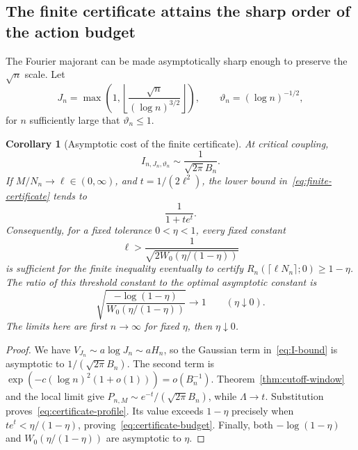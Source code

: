 \documentclass[11pt,a4paper]{article}
\numberwithin{equation}{section}
\newtheorem{corollary}[theorem]{Corollary}
\theoremstyle{definition}
\theoremstyle{remark}
\begin{document}
\subsection{The finite certificate attains the sharp order of the action budget}
The Fourier majorant can be made asymptotically sharp enough to preserve the
\(\sqrt n\) scale. Let
\begin{equation}
 J_n=\max\left(1,\left\lfloor\frac{\sqrt n}{(\log n)^{3/2}}\right\rfloor\right),
 \qquad \vartheta_n=(\log n)^{-1/2},
 \label{eq:J-choice}
\end{equation}
for \(n\) sufficiently large that \(\vartheta_n\le1\).

\begin{corollary}[Asymptotic cost of the finite certificate]
\label{cor:certificate-budget}
At critical coupling,
\[
 I_{n,J_n,\vartheta_n}\sim\frac{1}{\sqrt{2\pi}B_n}.
\]
If \(M/N_n\to\ell\in(0,\infty)\), and \(t=1/(2\ell^2)\), the lower
bound in~\eqref{eq:finite-certificate} tends to
\begin{equation}
 \frac{1}{1+t e^t}.
 \label{eq:certificate-profile}
\end{equation}
Consequently, for a fixed tolerance \(0<\eta<1\), every fixed constant
\begin{equation}
 \ell>\frac{1}{\sqrt{2W_0(\eta/(1-\eta))}}
 \label{eq:certificate-budget}
\end{equation}
is sufficient for the finite inequality eventually to certify
\(R_n(\lceil\ell N_n\rceil;0)\ge1-\eta\).
The ratio of this threshold constant to the optimal asymptotic constant is
\begin{equation}
 \sqrt{\frac{-\log(1-\eta)}{W_0(\eta/(1-\eta))}}
 \longrightarrow1\qquad(\eta\downarrow0).
 \label{eq:certificate-efficiency}
\end{equation}
The limits here are first \(n\to\infty\) for fixed \(\eta\), then
\(\eta\downarrow0\).
\end{corollary}
\begin{proof}
We have \(V_{J_n}\sim a\log J_n\sim aH_n\), so the Gaussian term
in~\eqref{eq:I-bound} is asymptotic to \(1/(\sqrt{2\pi}B_n)\).
The second term is \(\exp(-c(\log n)^2(1+o(1)))=o(B_n^{-1})\).
Theorem~\ref{thm:cutoff-window} and the local limit give
\(P_{n,M}\sim e^{-t}/(\sqrt{2\pi}B_n)\), while \(\Lambda\to t\).
Substitution proves~\eqref{eq:certificate-profile}.
Its value exceeds \(1-\eta\) precisely when
\(te^t<\eta/(1-\eta)\), proving~\eqref{eq:certificate-budget}.
Finally, both \(-\log(1-\eta)\) and \(W_0(\eta/(1-\eta))\) are
asymptotic to \(\eta\).
\end{proof}
\end{document}
